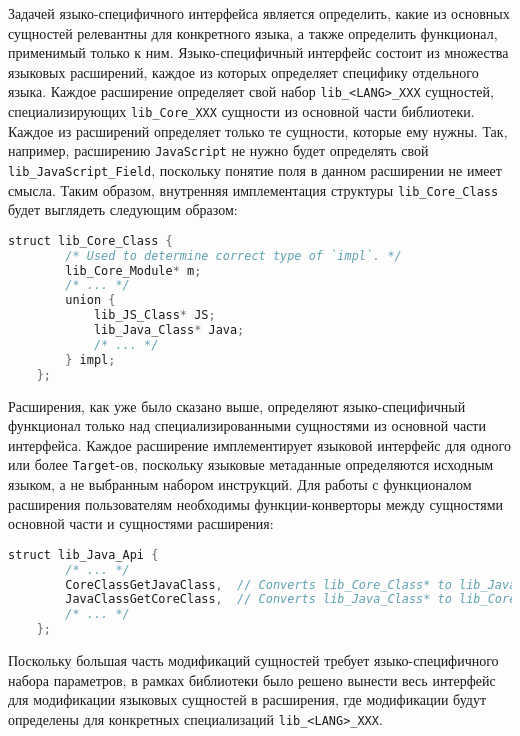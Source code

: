 Задачей языко-специфичного интерфейса является определить, какие из основных сущностей релевантны для конкретного языка, а также определить функционал, применимый только к ним. Языко-специфичный интерфейс состоит из множества языковых расширений, каждое из которых определяет специфику отдельного языка. Каждое расширение определяет свой набор \texttt{lib\_<LANG>\_XXX} сущностей, специализирующих \texttt{lib\_Core\_XXX} сущности из основной части библиотеки. Каждое из расширений определяет только те сущности, которые ему нужны. Так, например, расширению \texttt{JavaScript} не нужно будет определять свой \texttt{lib\_JavaScript\_Field}, поскольку понятие поля в данном расширении не имеет смысла. Таким образом, внутренняя имплементация структуры \texttt{lib\_Core\_Class} будет выглядеть следующим образом:

\begin{lstlisting}[language=Java, caption=Внутренняя имплементация типа \texttt{lib\_Core\_Class}, label=lst:libClass]
    struct lib_Core_Class {
        /* Used to determine correct type of `impl`. */
        lib_Core_Module* m;
        /* ... */
        union {
            lib_JS_Class* JS;
            lib_Java_Class* Java;
            /* ... */
        } impl;
    };
\end{lstlisting}

Расширения, как уже было сказано выше, определяют языко-специфичный функционал только над специализированными сущностями из основной части интерфейса. Каждое расширение имплементирует языковой интерфейс для одного или более \texttt{Target}-ов, поскольку языковые метаданные определяются исходным языком, а не выбранным набором инструкций. Для работы с функционалом расширения пользователям необходимы функции-конверторы между сущностями основной части и сущностями расширения:

\begin{lstlisting}[language=Java, caption=Пример функций-конверторов., label=lst:libConvertors]
    struct lib_Java_Api {
        /* ... */
        CoreClassGetJavaClass,  // Converts lib_Core_Class* to lib_Java_Class*
        JavaClassGetCoreClass,  // Converts lib_Java_Class* to lib_Core_Class*
        /* ... */
    };
\end{lstlisting}

Поскольку большая часть модификаций сущностей требует языко-специфичного набора параметров, в рамках библиотеки было решено вынести весь интерфейс для модификации языковых сущностей в расширения, где модификации будут определены для конкретных специализаций \texttt{lib\_<LANG>\_XXX}.

